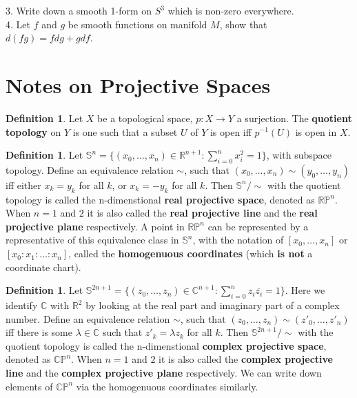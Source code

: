 \documentclass{article}
\theoremstyle{definition}
\newtheorem{dfn}[thm]{Definition}
\begin{document}
3. Write down a smooth 1-form on $S^3$ which is non-zero everywhere.\\

4. Let $f$ and $g$ be smooth functions on manifold $M$, show that $d(fg)=fdg+gdf$.\\

\newpage

\section{Notes on Projective Spaces}

\begin{dfn}
    Let $X$ be a topological space, $p: X\rightarrow Y$ a surjection. The {\bf quotient topology} on $Y$ is one such that a subset $U$ of $Y$ is open iff $p^{-1}(U)$ is open in $X$.
\end{dfn}

\begin{dfn}
    Let $\mathbb{S}^n=\{(x_0, \dots, x_n)\in\mathbb{R}^{n+1}: \sum_{i=0}^n x_i^2=1\}$, with subspace topology. Define an equivalence relation $\sim$, such that $(x_0, \dots, x_n)\sim (y_0, \dots, y_n)$ iff either $x_k=y_k$ for all $k$, or $x_k=-y_k$ for all $k$. Then $\mathbb{S}^n/\sim$ with the quotient topology is called the n-dimenstional {\bf real projective space}, denoted as $\mathbb{RP}^n$. When $n=1$ and $2$ it is also called the {\bf real projective line} and the {\bf real projective plane} respectively. A point in $\mathbb{RP}^n$ can be represented by a representative of this equivalence class in $\mathbb{S}^n$, with the notation of $[x_0, \dots, x_n]$ or $[x_0:x_1:\dots:x_n]$, called the {\bf homogenuous coordinates} (which {\bf is not} a coordinate chart). 
\end{dfn}

\begin{dfn}
    Let $\mathbb{S}^{2n+1}=\{(z_0, \dots, z_n)\in\mathbb{C}^{n+1}: \sum_{i=0}^n z_i\overline{z_i}=1\}$. Here we identify $\mathbb{C}$ with $\mathbb{R}^2$ by looking at the real part and imaginary part of a complex number. Define an equivalence relation $\sim$, such that $(z_0, \dots, z_n)\sim (z'_0, \dots, z'_n)$ iff there is some $\lambda\in\mathbb{C}$ such that $z'_k=\lambda z_k$ for all $k$. Then $\mathbb{S}^{2n+1}/\sim$ with the quotient topology is called the n-dimenstional {\bf complex projective space}, denoted as $\mathbb{CP}^n$. When $n=1$ and $2$ it is also called the {\bf complex projective line} and the {\bf complex projective plane} respectively. We can write down elements of $\mathbb{CP}^n$ via the homogenuous coordinates similarly. 
\end{dfn}
    
\end{document}
